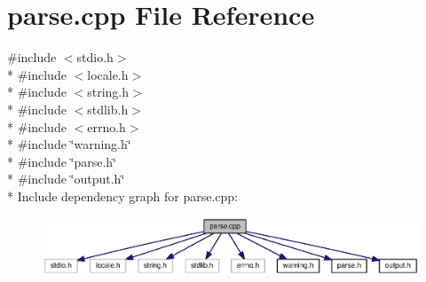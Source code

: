 \section{parse.\-cpp File Reference}
\label{parse_8cpp}
{\ttfamily \#include $<$stdio.\-h$>$}\\*
{\ttfamily \#include $<$locale.\-h$>$}\\*
{\ttfamily \#include $<$string.\-h$>$}\\*
{\ttfamily \#include $<$stdlib.\-h$>$}\\*
{\ttfamily \#include $<$errno.\-h$>$}\\*
{\ttfamily \#include \char`\"{}warning.\-h\char`\"{}}\\*
{\ttfamily \#include \char`\"{}parse.\-h\char`\"{}}\\*
{\ttfamily \#include \char`\"{}output.\-h\char`\"{}}\\*
Include dependency graph for parse.\-cpp\-:
\nopagebreak
\begin{figure}[H]
\begin{center}
\leavevmode
\includegraphics[width=350pt]{parse_8cpp__incl}
\end{center}
\end{figure}
